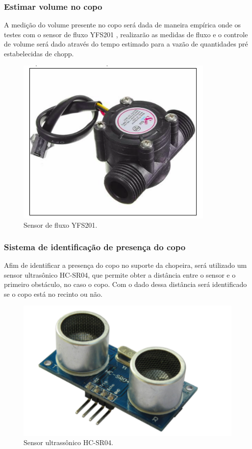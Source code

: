 			\subsubsection[Estimar volume no copo]{Estimar volume no copo}
				A medição do volume presente no copo será dada de maneira empírica onde os testes com o sensor de 
				fluxo YFS201 , realizarão as medidas de fluxo e o controle de volume será dado através do tempo 
				estimado para a vazão de quantidades pré estabelecidas de chopp.

			\begin{figure}[H]
				\centering
				\includegraphics[scale= 0.7]{figuras/sensor-fluxo.png}
				\caption{Sensor de fluxo YFS201.}
				\label{sensor-fluxo}
			\end{figure}
			
			\subsubsection[Sistema de identificação de presença do copo]{Sistema de identificação de presença do copo}
				Afim de identificar a presença do copo no suporte da chopeira, será utilizado um sensor ultrasônico HC-SR04, que permite obter a distância entre o sensor e o primeiro obstáculo, no caso o copo. Com o dado dessa distância será identificado se o copo está no recinto ou não.

			\begin{figure}[H]
				\centering
				\includegraphics[scale= 0.7]{figuras/sensor-ultrassonico.png}
				\caption{Sensor ultrassônico HC-SR04.}
				\label{sensor-ultrassonico}
			\end{figure}

